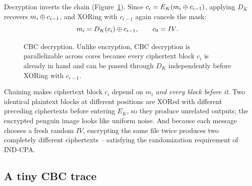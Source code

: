 Decryption inverts the chain (Figure~\ref{ch13:fig-cbc-dec}). Since $c_i = E_K(m_i \oplus c_{i-1})$, applying $D_K$ recovers $m_i \oplus c_{i-1}$, and XORing with $c_{i-1}$ again cancels the mask:
\[
m_i = D_K(c_i) \oplus c_{i-1}, \qquad c_0 = \mathit{IV}.
\]

\begin{figure}[htbp]
\centering
{}
\caption{CBC decryption. Unlike encryption, CBC decryption is parallelizable across cores because every ciphertext block $c_i$ is already in hand and can be passed through $D_K$ independently before XORing with $c_{i-1}$.}
\label{ch13:fig-cbc-dec}
\end{figure}

\begin{intuitionbox}
Chaining makes ciphertext block $c_i$ depend on $m_i$ \emph{and every block before it}. Two identical plaintext blocks at different positions are XORed with different preceding ciphertexts before entering $E_K$, so they produce unrelated outputs; the encrypted penguin image looks like uniform noise. And because each message chooses a fresh random $\mathit{IV}$, encrypting the same file twice produces two completely different ciphertexts -- satisfying the randomization requirement of IND-CPA.
\end{intuitionbox}

\subsection{A tiny CBC trace}

